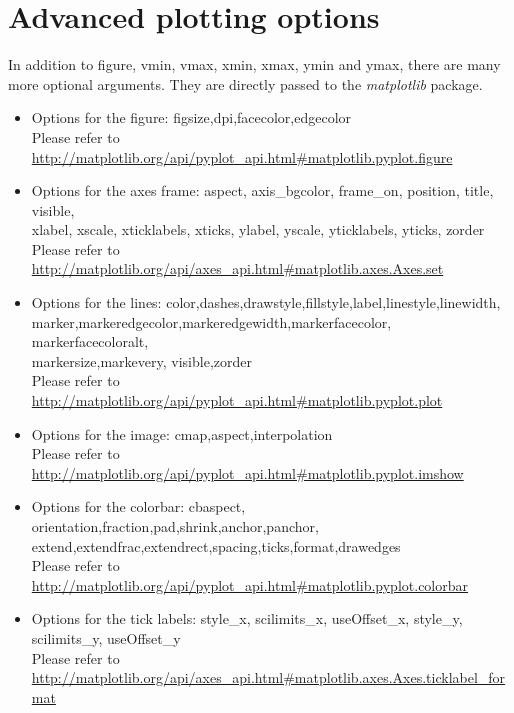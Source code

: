 \documentclass[11pt]{article}
\newcommand{\code}[1]{\colorbox{yellow!15}{\ttfamily #1}}
\begin{document}
\section{Advanced plotting options}
In addition to \code{figure}, \code{vmin}, \code{vmax}, \code{xmin}, \code{xmax}, \code{ymin} and \code{ymax}, there are many more optional arguments. They are directly passed to the \textit{matplotlib} package.
\begin{itemize}
\item Options for the figure: \code{figsize},\code{dpi},\code{facecolor},\code{edgecolor}\\
	Please refer to \url{http://matplotlib.org/api/pyplot_api.html#matplotlib.pyplot.figure}
\item Options for the axes frame: \code{aspect}, \code{axis\_bgcolor}, \code{frame\_on}, \code{position}, \code{title}, \code{visible},\\
	\code{xlabel}, \code{xscale}, \code{xticklabels}, \code{xticks}, \code{ylabel}, \code{yscale}, \code{yticklabels}, \code{yticks}, \code{zorder}\\
	Please refer to \url{http://matplotlib.org/api/axes_api.html#matplotlib.axes.Axes.set}
\item Options for the lines: \code{color},\code{dashes},\code{drawstyle},\code{fillstyle},\code{label},\code{linestyle},\code{linewidth},\\
	\code{marker},\code{markeredgecolor},\code{markeredgewidth},\code{markerfacecolor},	\code{markerfacecoloralt},\\
	\code{markersize},\code{markevery},	\code{visible},\code{zorder}\\
	Please refer to \url{http://matplotlib.org/api/pyplot_api.html#matplotlib.pyplot.plot}
\item Options for the image: \code{cmap},\code{aspect},\code{interpolation}\\
	Please refer to \url{http://matplotlib.org/api/pyplot_api.html#matplotlib.pyplot.imshow}
\item Options for the colorbar: \code{cbaspect}, \code{orientation},\code{fraction},\code{pad},\code{shrink},\code{anchor},\code{panchor},\\
	\code{extend},\code{extendfrac},\code{extendrect},\code{spacing},\code{ticks},\code{format},\code{drawedges}\\
	Please refer to \url{http://matplotlib.org/api/pyplot_api.html#matplotlib.pyplot.colorbar}
\item Options for the tick labels: \code{style\_x}, \code{scilimits\_x}, \code{useOffset\_x}, \code{style\_y}, \code{scilimits\_y}, \code{useOffset\_y}\\
	Please refer to \url{http://matplotlib.org/api/axes_api.html#matplotlib.axes.Axes.ticklabel_format}
\end{itemize}
\end{document}
